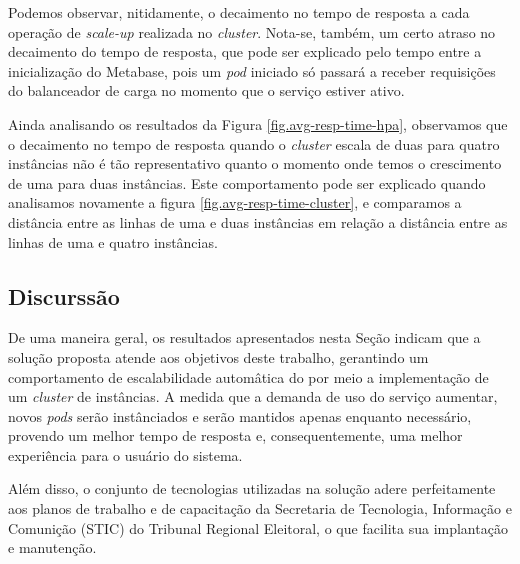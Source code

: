 Podemos observar, nitidamente, o decaimento no tempo de resposta a cada operação de \textit{scale-up} realizada no \textit{cluster}. Nota-se, também, um certo atraso no decaimento do tempo de resposta, que pode ser explicado pelo tempo entre a inicialização do Metabase, pois um \textit{pod} iniciado só passará a receber requisições do balanceador de carga no momento que o serviço estiver ativo.

Ainda analisando os resultados da Figura \ref{fig.avg-resp-time-hpa}, observamos que o decaimento no tempo de resposta quando o \textit{cluster} escala de duas para quatro instâncias não é tão representativo quanto o momento onde temos o crescimento de uma para duas instâncias. Este comportamento pode ser explicado quando analisamos novamente a figura \ref{fig.avg-resp-time-cluster}, e comparamos a distância entre as linhas de uma e duas instâncias em relação a distância entre as linhas de uma e quatro instâncias.


\subsection{Discurssão}

De uma maneira geral, os resultados apresentados nesta Seção indicam que a solução proposta atende aos objetivos deste trabalho, gerantindo um comportamento de escalabilidade automâtica do  por meio a implementação de um \textit{cluster} de instâncias. A medida que a demanda de uso do serviço aumentar, novos \textit{pods} serão instânciados e serão mantidos apenas enquanto necessário, provendo um melhor tempo de resposta e, consequentemente, uma melhor experiência para o usuário do sistema. 

Além disso, o conjunto de tecnologias utilizadas na solução adere perfeitamente aos planos de trabalho e de capacitação da Secretaria de Tecnologia, Informação e Comunição (STIC) do Tribunal Regional Eleitoral, o que facilita sua implantação e manutenção.

